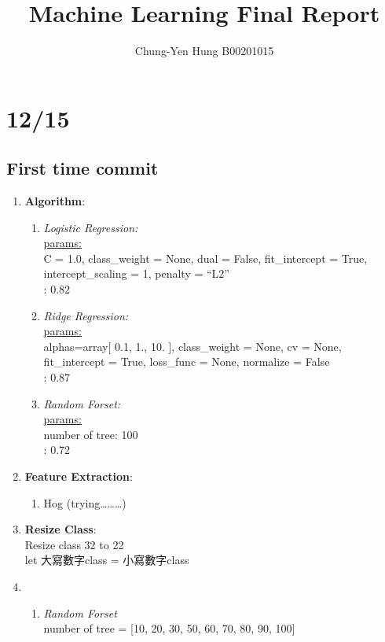 \documentclass[12pt]{article}
\theoremstyle{definition}
\theoremstyle{remark}
\begin{document}

\title{Machine Learning Final Report}
\author{Chung-Yen Hung B00201015}
\maketitle


\section{12/15}
\subsection{First time commit}
\begin{enumerate}
  \item \textbf{Algorithm}:
      \begin{enumerate}
        \item {\em Logistic Regression:\/}\\
           \underline{params:} \\
            C = 1.0, class\_weight = None, dual = False, fit\_intercept = True, intercept\_scaling = 1, penalty = ``L2''\\
            {\color{red}{track 0: E\_out}: 0.82}
          \item {\em Ridge Regression:\/} \\
            \underline{params:} \\
            alphas=array[  0.1,   1.,  10. ], class\_weight = None, cv = None, fit\_intercept = True, loss\_func = None, normalize = False \\
            {\color{red}{track 0: E\_out}: 0.87} \\
          \item {\em Random Forset:\/} \\
            \underline{params:} \\
            number of tree: 100 \\
            {\color{red}{track 0: E\_out}: 0.72}
      \end{enumerate}
    \item \textbf{Feature Extraction}:
      \begin{enumerate}
        \item Hog (trying\dots\dots\dots)
      \end{enumerate}

    \item \textbf{Resize Class}:\\
      Resize class 32 to 22\\
      let 大寫數字class =  小寫數字class
    \item {}
      \begin{enumerate}
        \item {\em Random Forset\/}\\ 
          number of tree = [10, 20, 30, 50, 60, 70, 80, 90, 100]
      \end{enumerate}
\end{enumerate}
\end{document}
